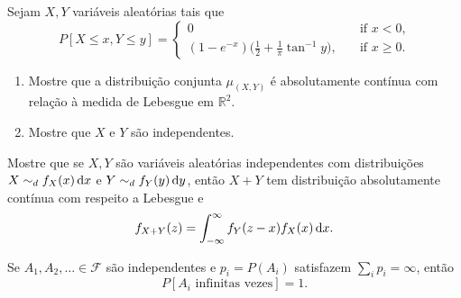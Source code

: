 \begin{exercise}
  Sejam $X, Y$ vari\'aveis aleat\'orias tais que
  \begin{equation}
    P[X \leq x, Y \leq y] =
    \begin{cases}
      0 & \quad \text{if $x < 0$,}\\
      (1-e^{-x}) \Big(\frac 12 + \frac 1\pi \tan^{-1} y \Big), & \quad \text{if $x \geq 0$}.
    \end{cases}
  \end{equation}
  \begin{enumerate}[\quad a)]
  \item Mostre que a distribui\c{c}\~ao conjunta $\mu_{(X,Y)}$ \'e
    absolutamente cont\'inua com rela\c{c}\~ao \`a medida de Lebesgue em
    $\mathbb{R}^2$.
  \item Mostre que $X$ e $Y$ s\~ao independentes.
  \end{enumerate}
\end{exercise}

\begin{exercise}
  \label{x:convolucao_densidade}
  Mostre que se $X, Y$ são variáveis aleatórias independentes com distribuições $X \sim_d f_X(x) \mathop{}\!\mathrm{d} x$ e $Y \sim_d f_Y(y) \mathop{}\!\mathrm{d} y$, então $X + Y$ tem distribuição absolutamente contínua com respeito a Lebesgue e
  \begin{equation}
    f_{X + Y}(z) = \int_{-\infty}^\infty f_Y(z - x) f_X(x) \mathop{}\!\mathrm{d} x.
  \end{equation}
\end{exercise}


\begin{lemma}
  Se $A_1, A_2, \dots \in \mathcal{F}$ são independentes e $p_i = P(A_i)$ satisfazem $\sum_i p_i = \infty$, então
  \begin{equation}
    P[A_i \text{ infinitas vezes}] = 1.
  \end{equation}
\end{lemma}

